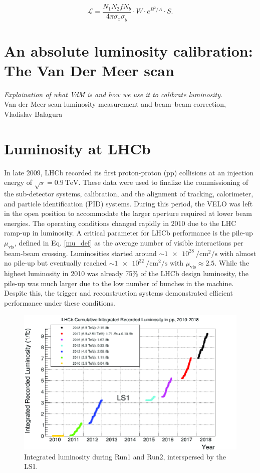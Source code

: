 \begin{equation}
\mathcal{L} = \frac{N_1  N_2  f  N_b}{4 \pi  \sigma_x  \sigma_y} \cdot W \cdot e^{B^2/A} \cdot S.
\end{equation}

\section{An absolute luminosity calibration: The Van Der Meer scan}
\textit{Explaination of what VdM is and how we use it to calibrate luminosity.}\\
Van der Meer scan luminosity measurement and beam–beam correction, Vladislav Balagura



\section{Luminosity at LHCb}
In late 2009, LHCb recorded its first proton-proton (pp) collisions at an injection energy of $\sqrt{s}=\SI{0.9}{\tera\eV}$. These data were used to finalize the commissioning of the sub-detector systems, calibration, and the alignment of tracking, calorimeter, and particle identification (PID) systems. During this period, the VELO was left in the open position to accommodate the larger aperture required at lower beam energies.
The operating conditions changed rapidly in 2010 due to the LHC ramp-up in luminosity. A critical parameter for LHCb performance is the pile-up \(\mu_{\text{vis}}\), defined in Eq. \ref{mu_def} as the average number of visible interactions per beam-beam crossing. Luminosities started around $\sim \SI{1e28}{\per\centi\meter\squared\per\second}$ with almost no pile-up but eventually reached $\sim \SI{1e32}{\per\centi\meter\squared\per\second}$ with $\mu_{\text{vis}} \approx 2.5$.
While the highest luminosity in 2010 was already 75\% of the LHCb design luminosity, the pile-up was much larger due to the low number of bunches in the machine. Despite this, the trigger and reconstruction systems demonstrated efficient performance under these conditions.

\begin{figure}
    \centering
    \includegraphics[width=\textwidth]{figures/lumiRun2.png}
    \caption{Integrated luminosity during Run1 and Run2, interspersed by the LS1.}
    \label{fig:lumiRun1Run2}
\end{figure}

